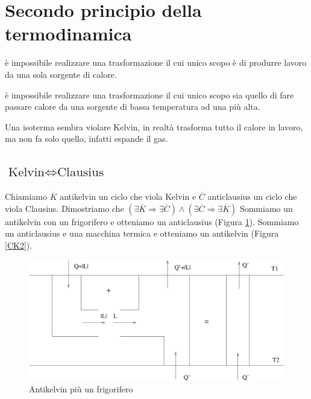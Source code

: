 \section{Secondo principio della termodinamica}

\begin{Pri}
è impossibile realizzare una trasformazione il cui unico scopo è di produrre lavoro da una sola sorgente di calore.
\end{Pri}

\begin{Pri}
è impossibile realizzare una trasformazione il cui unico scopo sia quello di fare passare calore da una sorgente di bassa temperatura ad una più alta.
\end{Pri}

Una isoterma sembra violare Kelvin, in realtà trasforma tutto il calore in lavoro, ma non fa solo quello, infatti espande il gas.
\subsection{$\text{Kelvin}\Leftrightarrow\text{Clausius}$}

Chiamiamo $\overline{K}$ antikelvin un ciclo che viola Kelvin e $\overline{C}$ anticlausius un ciclo che viola Clausius. Dimostriamo che $(\exists\overline{K}\Rightarrow\exists\overline{C})\wedge(\exists\overline{C}\Rightarrow\exists\overline{K})$
Sommiamo un antikelvin con un frigorifero e otteniamo un anticlausius (Figura \ref{CK1}).
Sommiamo un anticlausius e una macchina termica e otteniamo un antikelvin (Figura \ref{CK2}).
\begin{figure}[htbp]
\centering
\includegraphics[scale=0.5]{immagini/fisica1/AK+Frigo}
\caption{Antikelvin più un frigorifero}
\label{CK1}
\end{figure}

